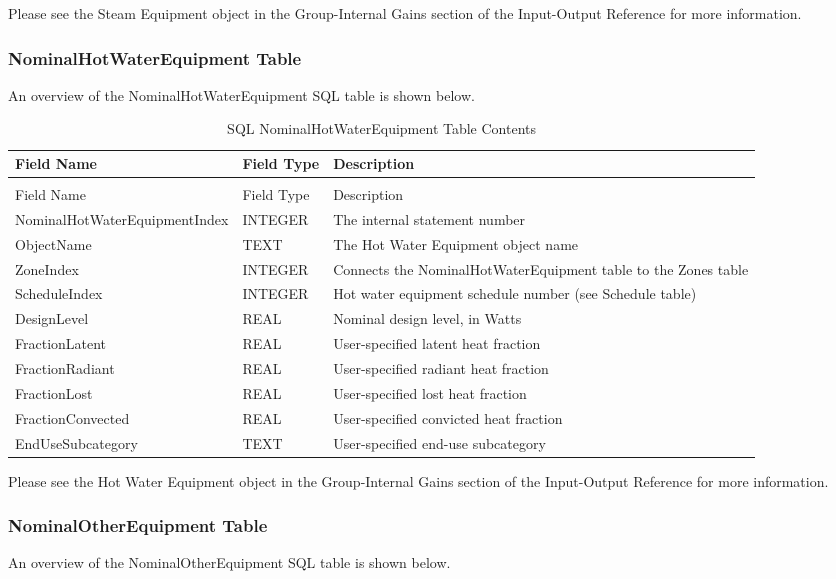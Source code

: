 Please see the Steam Equipment object in the Group-Internal Gains section of the Input-Output Reference for more information.

\subsubsection{NominalHotWaterEquipment Table}

An overview of the NominalHotWaterEquipment SQL table is shown below.

\begin{longtable}[c]{p{1.5in}p{1.5in}p{2.99in}}
\caption{SQL NominalHotWaterEquipment Table Contents \label{table:table-20.-sql-nominalhotwaterequipment-table}} \tabularnewline
\toprule 
Field Name & Field Type & Description \tabularnewline
\midrule
\endfirsthead

\caption[]{SQL NominalHotWaterEquipment Table Contents} \tabularnewline
\toprule 
Field Name & Field Type & Description \tabularnewline
\midrule
\endhead

NominalHotWaterEquipmentIndex & INTEGER & The internal statement number \tabularnewline
ObjectName & TEXT & The Hot Water Equipment object name \tabularnewline
ZoneIndex & INTEGER & Connects the NominalHotWaterEquipment table to the Zones table \tabularnewline
ScheduleIndex & INTEGER & Hot water equipment schedule number (see Schedule table) \tabularnewline
DesignLevel & REAL & Nominal design level, in Watts \tabularnewline
FractionLatent & REAL & User-specified latent heat fraction \tabularnewline
FractionRadiant & REAL & User-specified radiant heat fraction \tabularnewline
FractionLost & REAL & User-specified lost heat fraction \tabularnewline
FractionConvected & REAL & User-specified convicted heat fraction \tabularnewline
EndUseSubcategory & TEXT & User-specified end-use subcategory \tabularnewline
\bottomrule
\end{longtable}

Please see the Hot Water Equipment object in the Group-Internal Gains section of the Input-Output Reference for more information.

\subsubsection{NominalOtherEquipment Table}

An overview of the NominalOtherEquipment SQL table is shown below.

